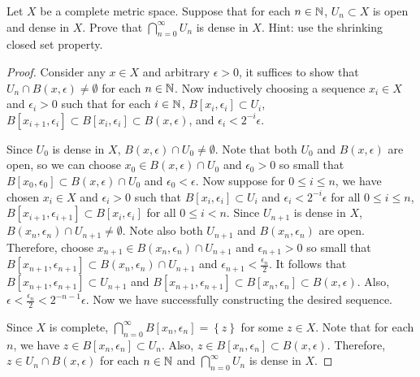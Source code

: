 \documentclass[a4paper]{article}
\begin{document}
\begin{thm}
Let $X$ be a complete metric space.  Suppose that for each
$n \in \mathbb{N}$, $U_n \subset X$ is open and dense in $X$.
Prove that $\bigcap_{n=0}^\infty U_n$ is dense in $X$.
Hint: use the shrinking closed set property.
\end{thm}

\begin{proof}
  Consider any $x \in X$ and arbitrary $\epsilon > 0$, it
  suffices to show that $U_n \cap B(x, \epsilon)
  \neq \emptyset$ for each $n \in \mathbb{N}$.
  Now inductively choosing a sequence
  $x_i \in X$ and $\epsilon_i > 0$ such that
  for each $i \in \mathbb{N}$, $B[x_i, \epsilon_i] \subset U_i$,
  $B[x_{i+1}, \epsilon_i] \subset B[x_i, \epsilon_i]
  \subset B(x, \epsilon)$, and $\epsilon_i < 2^{-i} \epsilon$.

  Since $U_0$ is dense in $X$,
  $B(x, \epsilon) \cap U_0 \neq \emptyset$.
  Note that both $U_0$ and $B(x, \epsilon)$ are open, so
  we can choose $x_0 \in B(x, \epsilon) \cap U_0$
  and $\epsilon_0 > 0$ so small
  that $B[x_0, \epsilon_0] \subset B(x, \epsilon) \cap U_0$
  and $\epsilon_0 < \epsilon$.
  Now suppose
  for $0 \leq i \leq n$, we have chosen $x_i \in X$
  and $\epsilon_i > 0$ such that
  $B[x_i, \epsilon_i] \subset U_i$
  and $\epsilon_i < 2^{-i} \epsilon$
  for all $0 \leq i \leq n$,
  $B[x_{i+1}, \epsilon_{i+1}] \subset
  B[x_i, \epsilon_i]$ for all $0 \leq i < n$.
  Since $U_{n+1}$ is dense in $X$, $B(x_n, \epsilon_n)
  \cap U_{n+1} \neq \emptyset$. Note also both $U_{n+1}$
  and $B(x_n, \epsilon_n)$ are open.
  Therefore, choose
  $x_{n+1} \in B(x_n, \epsilon_n) \cap U_{n+1}$ and
  $\epsilon_{n+1} > 0$ so small that
  $B[x_{n+1}, \epsilon_{n+1}] \subset B(x_n, \epsilon_n)
  \cap U_{n+1}$ and $\epsilon_{n+1} < \frac{\epsilon_n}{2}$.
  It follows that
  $B[x_{n+1}, \epsilon_{n+1}] \subset U_{n+1}$ and
  $B[x_{n+1}, \epsilon_{n+1}] \subset B[x_n, \epsilon_n]
  \subset B(x, \epsilon)$. Also,
  $\epsilon < \frac{\epsilon_n}{2} < 2^{-n-1} \epsilon$.
  Now we have successfully constructing the desired sequence.

  Since $X$ is complete, $\bigcap_{n=0}^\infty B[x_n, \epsilon_n]
  = \left\{ z \right\}$ for some $z \in X$. Note that
  for each $n$, we have $z \in B[x_n, \epsilon_n] \subset U_n$.
  Also,
  $z \in B[x_n, \epsilon_n] \subset B(x, \epsilon)$.
  Therefore, $z \in U_n \cap B(x, \epsilon)$ for each $n \in \mathbb{N}$
  and $\bigcap_{n=0}^\infty U_n$ is dense in $X$.

\end{proof}
\end{document}
